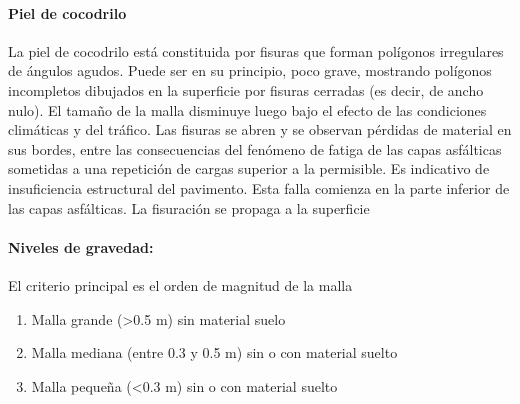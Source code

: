\paragraph{Piel de cocodrilo}

	La piel de cocodrilo está constituida por fisuras que forman polígonos irregulares de ángulos agudos. Puede ser en su principio, poco grave, mostrando polígonos incompletos dibujados en la superficie por fisuras cerradas (es decir, de ancho nulo). El tamaño de la malla disminuye luego bajo el efecto de las condiciones climáticas y del tráfico. Las fisuras se abren y se observan pérdidas de material en sus bordes, entre las consecuencias del fenómeno de fatiga de las capas asfálticas sometidas a una repetición de cargas superior a la permisible. Es indicativo de insuficiencia estructural del pavimento. Esta falla comienza en la parte inferior de las capas asfálticas. La fisuración se propaga a la superficie
	\paragraph*{Niveles de gravedad:} El criterio principal es el orden de magnitud de la malla 
	
	\begin{enumerate}
		\renewcommand{\labelenumi}{\alph{enumi})} 
		\item Malla grande (>0.5 m) sin material suelo
		\item Malla mediana (entre 0.3 y 0.5 m) sin o con material suelto
		\item Malla pequeña (<0.3 m) sin o con material suelto
	\end{enumerate}

	

